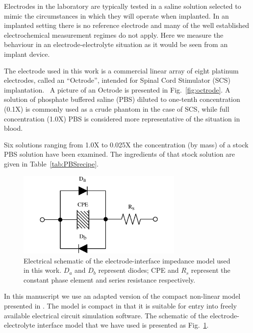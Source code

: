 \documentclass[journal, a4paper]{IEEEtran}
\begin{document}
Electrodes in the laboratory are typically tested in a saline solution selected to mimic the circumstances in which they will operate when implanted. In an implanted setting there is no reference electrode and many of the well established electrochemical measurement regimes do not apply. Here we measure the behaviour in an electrode-electrolyte situation as it would be seen from an implant device.

The electrode used in this work is a commercial linear array of eight platinum electrodes, called an ``Octrode'', intended for Spinal Cord Stimulator (SCS) implantation.~\cite{StJudeOctrode} A picture of an Octrode is presented in Fig.~\ref{fig:octrode}. A solution of phosphate buffered saline (PBS) diluted to one-tenth concentration (0.1X) is commonly used as a crude phantom in the case of SCS, while full concentration (1.0X) PBS is considered more representative of the situation in blood.

Six solutions ranging from 1.0X to 0.025X the concentration (by mass) of a stock PBS solution have been examined.
The ingredients of that stock solution are given in Table~\ref{tab:PBSrecipe}.

\begin{figure}
    \begin{center}
        \includegraphics[width=230pt]{graphics/interfaceSchematic_noMemristive}
    \end{center}
    \caption{Electrical schematic of the electrode-interface impedance model used in this work. $D_{a}$ and $D_{b}$ represent diodes; CPE and $R_{s}$ represent the constant phase element and series resistance respectively.}
    \label{fig:schematic}
\end{figure}

    In this manuscript we use an adapted version of the compact non-linear model presented in \cite{ScottSingle2013}. The model is compact in that it is suitable for entry into freely available electrical circuit simulation software. The schematic of the electrode-electrolyte interface model that we have used is presented as Fig.~\ref{fig:schematic}.
\end{document}
